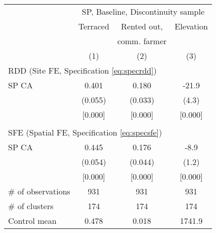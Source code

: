 \begin{tabular}{lccc}
\hline \hline
 & \multicolumn{3}{c}{SP, Baseline, Discontinuity sample} \\
\cmidrule(lr){2-4}
 & Terraced & Rented out, & Elevation \\
 & & comm. farmer & \\
\cmidrule(lr){2-2}\cmidrule(lr){3-3}\cmidrule(lr){4-4}
 & (1) & (2) & (3) \\
\hline
\multicolumn{3}{l}{RDD (Site FE, Specification \ref{eq:specrdd})} & \\
\cmidrule(lr){1-3}
SP CA & 0.401 & 0.180 & -21.9\hphantom{-} \\
 & (0.055) & (0.033) & (4.3) \\
 & [0.000] & [0.000] & [0.000] \\
\\[-0.5em]
\multicolumn{3}{l}{SFE (Spatial FE, Specification \ref{eq:specsfe})} & \\
\cmidrule(lr){1-3}
SP CA & 0.445 & 0.176 & -8.9\hphantom{-} \\
 & (0.054) & (0.044) & (1.2) \\
 & [0.000] & [0.000] & [0.000] \\
\hline
\# of observations & 931 & 931 & 931 \\
\# of clusters & 174 & 174 & 174 \\
Control mean & 0.478 & 0.018 & 1741.9 \\
\hline
\end{tabular}
